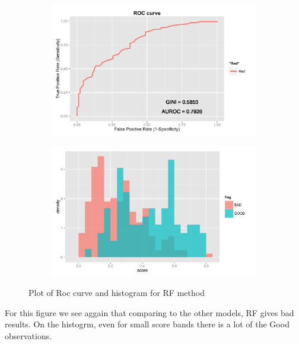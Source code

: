 \documentclass[10pt]{article}\usepackage[]{graphicx}\usepackage[]{color}
\begin{document}
\clearpage

\begin{figure}[h!]
        \centering
        \begin{subfigure}[b]{0.45\textwidth}
                \includegraphics[width=\textwidth]{Plots/ROC_RF}
                \caption{}
                \label{fig:ROC_ RF}
        \end{subfigure}
        \begin{subfigure}[b]{0.45\textwidth}
                \includegraphics[width=\textwidth]{Plots/HIST_RF}
                \label{fig:HIST_ RF}
        \end{subfigure}

        \caption{Plot of Roc curve and histogram for RF method}\label{fig:RF}
\end{figure}

For this figure we see aggain that comparing to the other models, RF gives bad results. On the histogrm, even for small score bands there is a lot of the Good observations. 
\end{document}
